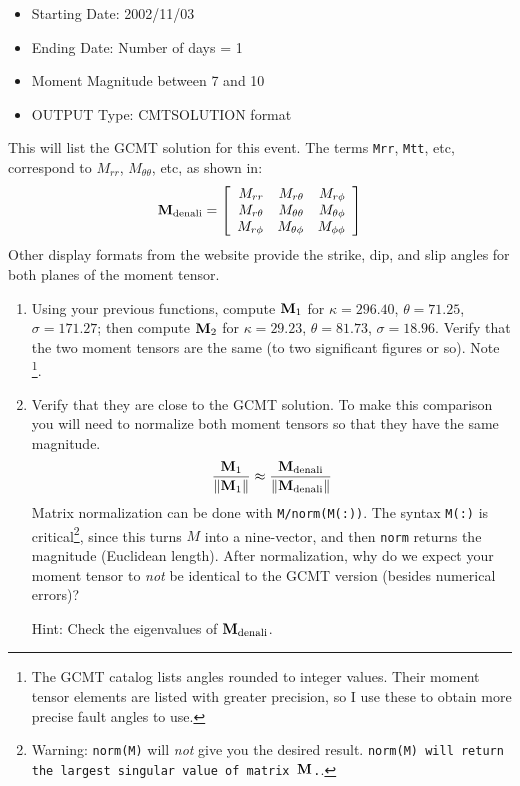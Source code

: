 \documentclass[11pt,titlepage,fleqn]{article}
\begin{document}
\begin{enumerate}
\begin{itemize}
\item Starting Date: 2002/11/03
\item Ending Date: Number of days = 1
\item Moment Magnitude between 7 and 10
\item OUTPUT Type: CMTSOLUTION format
\end{itemize}
%
This will list the GCMT solution for this event. The terms \verb+Mrr+, \verb+Mtt+, etc, correspond to $M_{rr}$, $M_{\theta\theta}$, etc, as shown in:
%
\begin{equation}
\mbox{${\bf M}$}_{\rm denali} =
\left[ \begin{array}{rrr}
   M_{rr}     &  M_{r\theta}     & M_{r\phi}  \\
   M_{r\theta}  &  M_{\theta\theta} &  M_{\theta\phi}  \\
   M_{r\phi}   &  M_{\theta\phi}   &  M_{\phi\phi}
\end{array} \right]
\end{equation}
%
Other display formats from the website provide the strike, dip, and slip angles for both planes of the moment tensor.

\begin{enumerate}
\item Using your previous functions, compute $\mbox{${\bf M}$}_1$ for $\kappa = 296.40$, $\theta = 71.25$, $\sigma = 171.27$; then compute $\mbox{${\bf M}$}_2$ for $\kappa = 29.23$, $\theta = 81.73$, $\sigma = 18.96$. Verify that the two moment tensors are the same (to two significant figures or so). Note \footnote{The GCMT catalog lists angles rounded to integer values. Their moment tensor elements are listed with greater precision, so I use these to obtain more precise fault angles to use.}.

\item Verify that they are close to the GCMT solution. To make this comparison you will need to normalize both moment tensors so that they have the same magnitude.
%
\begin{equation}
\frac{\mbox{${\bf M}$}_1}{\|\mbox{${\bf M}$}_1\|} \approx \frac{\mbox{${\bf M}$}_{\rm denali} }{\|\mbox{${\bf M}$}_{\rm denali}\|}
\end{equation}
%
Matrix normalization can be done with \verb+M/norm(M(:))+. The syntax \verb+M(:)+ is critical\footnote{Warning: {\tt norm(M)} will {\em not} give you the desired result. {\tt norm(M) will return the largest singular value of matrix $\mbox{${\bf M}$}$.}.}, since this turns $M$ into a nine-vector, and then \verb+norm+ returns the magnitude (\ie Euclidean length). After normalization, why do we expect your moment tensor to {\em not} be identical to the GCMT version (besides numerical errors)?

Hint: Check the eigenvalues of $\mbox{${\bf M}$}_{\rm denali}$.


\end{enumerate}

\end{enumerate}
\end{document}
